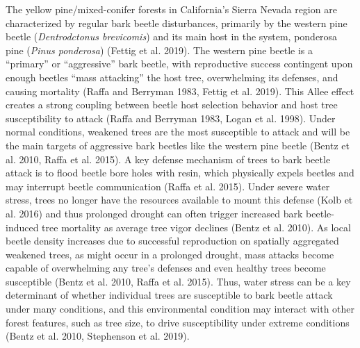 \documentclass[]{article}
\begin{document}
The yellow pine/mixed-conifer forests in California's Sierra Nevada
region are characterized by regular bark beetle disturbances, primarily
by the western pine beetle (\emph{Dentrodctonus brevicomis}) and its
main host in the system, ponderosa pine (\emph{Pinus ponderosa}) (Fettig
et al. 2019). The western pine beetle is a ``primary'' or ``aggressive''
bark beetle, with reproductive success contingent upon enough beetles
``mass attacking'' the host tree, overwhelming its defenses, and causing
mortality (Raffa and Berryman 1983, Fettig et al. 2019). This Allee
effect creates a strong coupling between beetle host selection behavior
and host tree susceptibility to attack (Raffa and Berryman 1983, Logan
et al. 1998). Under normal conditions, weakened trees are the most
susceptible to attack and will be the main targets of aggressive bark
beetles like the western pine beetle (Bentz et al. 2010, Raffa et al.
2015). A key defense mechanism of trees to bark beetle attack is to
flood beetle bore holes with resin, which physically expels beetles and
may interrupt beetle communication (Raffa et al. 2015). Under severe
water stress, trees no longer have the resources available to mount this
defense (Kolb et al. 2016) and thus prolonged drought can often trigger
increased bark beetle-induced tree mortality as average tree vigor
declines (Bentz et al. 2010). As local beetle density increases due to
successful reproduction on spatially aggregated weakened trees, as might
occur in a prolonged drought, mass attacks become capable of
overwhelming any tree's defenses and even healthy trees become
susceptible (Bentz et al. 2010, Raffa et al. 2015). Thus, water stress
can be a key determinant of whether individual trees are susceptible to
bark beetle attack under many conditions, and this environmental
condition may interact with other forest features, such as tree size, to
drive susceptibility under extreme conditions (Bentz et al. 2010,
Stephenson et al. 2019).
\end{document}
